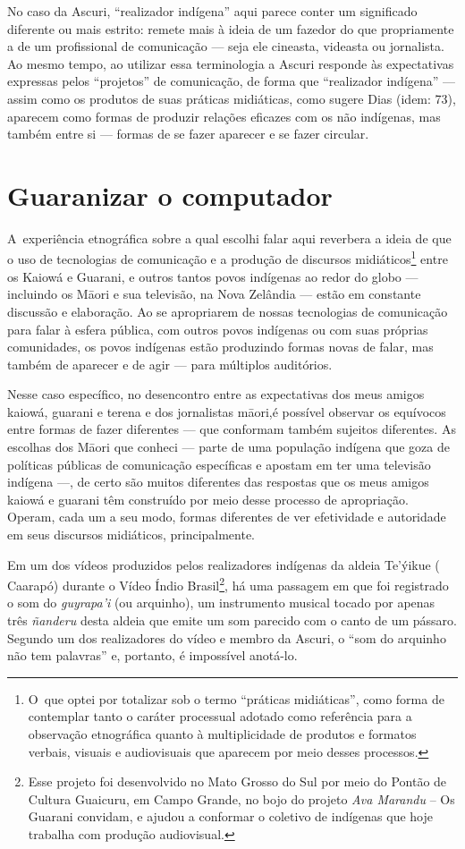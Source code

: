 No caso da Ascuri, ``realizador indígena'' aqui parece conter um
significado diferente ou mais estrito: remete mais à ideia de um
fazedor do que propriamente a de um profissional de comunicação --- seja
ele cineasta, videasta ou jornalista. Ao mesmo tempo, ao utilizar essa
terminologia a Ascuri responde às expectativas expressas pelos
``projetos'' de comunicação, de forma que ``realizador indígena'' --- assim
como os produtos de suas práticas midiáticas, como sugere Dias (idem:
73), aparecem como formas de produzir relações eficazes com os não
indígenas, mas também entre si --- formas de se fazer aparecer e se fazer
circular.


\section{Guaranizar o computador}

A~experiência etnográfica sobre a qual escolhi falar aqui reverbera a
ideia de que o uso de tecnologias de comunicação e a produção de
discursos midiáticos\footnote[13]{O~que optei por totalizar sob o termo
``práticas midiáticas'', como forma de contemplar tanto o caráter
processual adotado como referência para a observação etnográfica quanto
à multiplicidade de produtos e formatos verbais, visuais e audiovisuais
que aparecem por meio desses processos.} entre os Kaiowá e Guarani, e
outros tantos povos indígenas ao redor do globo --- incluindo os M\=aori
e sua televisão, na Nova Zelândia --- estão em constante discussão e
elaboração. Ao se apropriarem de nossas tecnologias de comunicação para
falar à esfera pública, com outros povos indígenas ou com suas próprias
comunidades, os povos indígenas estão produzindo formas novas de falar,
mas também de aparecer e de agir --- para múltiplos auditórios.

Nesse caso específico, no desencontro entre as expectativas dos meus
amigos kaiowá, guarani e terena e dos jornalistas m\=aori,é possível observar os
equívocos entre formas de fazer diferentes --- que conformam também
sujeitos diferentes. As escolhas dos M\=aori que conheci --- parte de uma
população indígena que goza de políticas públicas de comunicação
específicas e apostam em ter uma televisão indígena ---, de certo são
muitos diferentes das respostas que os meus amigos kaiowá e guarani têm
construído por meio desse processo de apropriação. Operam, cada um a
seu modo, formas diferentes de ver efetividade e autoridade em seus
discursos midiáticos, principalmente.

Em um dos vídeos produzidos pelos realizadores indígenas da aldeia
Te’ýikue ( Caarapó) durante o Vídeo Índio Brasil\footnote[14]{Esse
projeto foi desenvolvido no Mato Grosso do Sul por meio do Pontão de
Cultura Guaicuru, em Campo Grande, no bojo do projeto \emph{Ava Marandu} -- Os
Guarani convidam, e ajudou a conformar o coletivo de indígenas que hoje
trabalha com produção audiovisual. }, há uma passagem em que foi
registrado o som do \emph{guyrapa’i} (ou arquinho), um instrumento musical
tocado por apenas três \emph{ñanderu} desta aldeia que emite um som parecido
com o canto de um pássaro. Segundo um dos realizadores do vídeo e
membro da Ascuri, o ``som do arquinho não tem palavras'' e, portanto, é
impossível anotá-lo.

